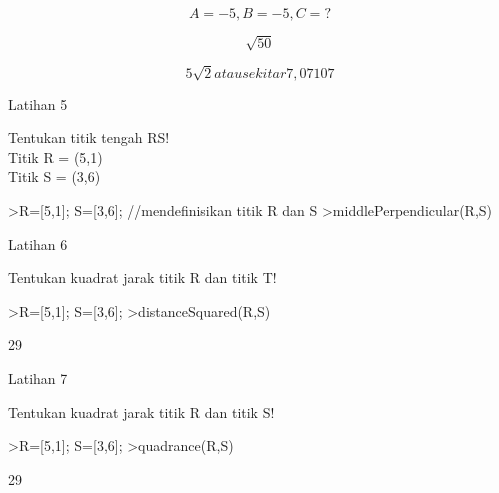 \documentclass[a4paper,10pt]{article}
\begin{document}
\begin{eulernotebook}
\begin{eulercomment}
\begin{eulercomment}
\begin{eulercomment}
\end{eulercomment}
\begin{eulerformula}
\[
A = -5, B =-5, C= ?
\]
\end{eulerformula}
\begin{eulerformula}
\[
\sqrt{50}
\]
\end{eulerformula}
\begin{eulerformula}
\[
5\sqrt{2} atau sekitar 7,07107
\]
\end{eulerformula}
\begin{eulercomment}
Latihan 5\\
\end{eulercomment}
\eulersubheading{}
\begin{eulercomment}
Tentukan titik tengah RS!\\
Titik R = (5,1)\\
Titik S = (3,6)
\end{eulercomment}
\begin{eulerprompt}
>R=[5,1]; S=[3,6]; //mendefinisikan titik R dan S
>middlePerpendicular(R,S)
\end{eulerprompt}
\begin{euleroutput}
  [2,  -5,  -9.5]
\end{euleroutput}
\begin{eulercomment}
Latihan 6\\
\end{eulercomment}
\eulersubheading{}
\begin{eulercomment}
Tentukan kuadrat jarak titik R dan titik T!
\end{eulercomment}
\begin{eulerprompt}
>R=[5,1]; S=[3,6];
>distanceSquared(R,S)
\end{eulerprompt}
\begin{euleroutput}
  29
\end{euleroutput}
\begin{eulercomment}
Latihan 7\\
\end{eulercomment}
\eulersubheading{}
\begin{eulercomment}
Tentukan kuadrat jarak titik R dan titik S!
\end{eulercomment}
\begin{eulerprompt}
>R=[5,1]; S=[3,6]; 
>quadrance(R,S)
\end{eulerprompt}
\begin{euleroutput}
  29
\end{euleroutput}
\begin{eulerprompt}

\end{eulerprompt}
\end{eulercomment}
\end{eulercomment}
\end{eulernotebook}
\end{document}
